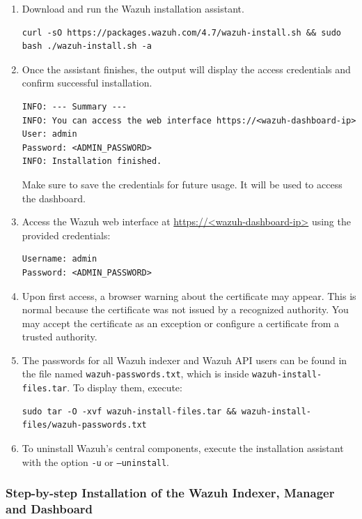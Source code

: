 \begin{enumerate}
  \item Download and run the Wazuh installation assistant.

  \begin{verbatim}
curl -sO https://packages.wazuh.com/4.7/wazuh-install.sh && sudo bash ./wazuh-install.sh -a
  \end{verbatim}

  \item Once the assistant finishes, the output will display the access credentials and confirm successful installation.

  \begin{verbatim}
INFO: --- Summary ---
INFO: You can access the web interface https://<wazuh-dashboard-ip>
User: admin
Password: <ADMIN_PASSWORD>
INFO: Installation finished.
  \end{verbatim}

  Make sure to save the credentials for future usage. It will be used to access the dashboard.

  \item Access the Wazuh web interface at \url{https://<wazuh-dashboard-ip>} using the provided credentials:

    \begin{verbatim}
Username: admin
Password: <ADMIN_PASSWORD>
    \end{verbatim}

  \item Upon first access, a browser warning about the certificate may appear. This is normal because the certificate was not issued by a recognized authority. You may accept the certificate as an exception or configure a certificate from a trusted authority.

  \item The passwords for all Wazuh indexer and Wazuh API users can be found in the file named \texttt{wazuh-passwords.txt}, which is inside \texttt{wazuh-install-files.tar}. To display them, execute:
  \begin{verbatim}
sudo tar -O -xvf wazuh-install-files.tar && wazuh-install-files/wazuh-passwords.txt
  \end{verbatim}

  \item To uninstall Wazuh's central components, execute the installation assistant with the option \texttt{-u} or \texttt{--uninstall}.
\end{enumerate}

\subsubsection{Step-by-step Installation of the Wazuh Indexer, Manager and Dashboard}

